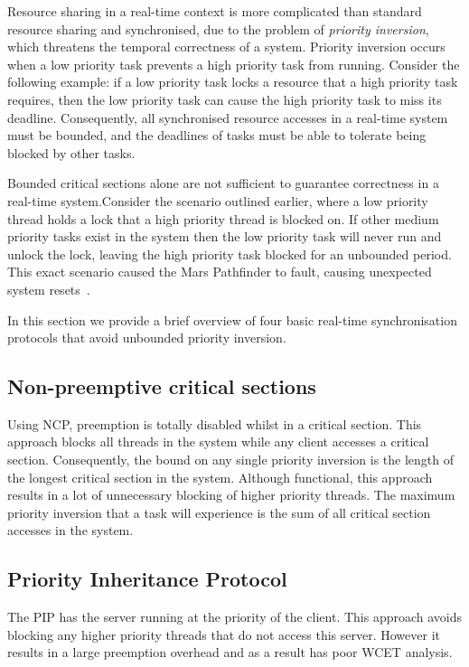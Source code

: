 Resource sharing in a real-time context is more complicated than standard resource sharing and synchronised, due to the problem of \emph{priority inversion}, which threatens the temporal correctness of a system.
Priority inversion occurs when a low priority task prevents a high priority task from running.
Consider the following example: if a low priority task locks a resource that a high priority task requires, then the low priority task can cause the high priority task to miss its deadline.
Consequently, all synchronised resource accesses in a real-time system must be bounded, and the deadlines of tasks must be able to tolerate being blocked by other tasks.

Bounded critical sections alone are not sufficient to guarantee correctness in a real-time system.Consider the scenario outlined earlier, where a low priority thread holds a lock that a high priority thread is blocked on.
If other medium priority tasks exist in the system then the low priority task will never run and unlock the lock, leaving the high priority task blocked for an unbounded period.
This exact scenario caused the Mars Pathfinder to fault, causing unexpected system resets~\citep{Mars_Pathfinder}.

In this section we provide a brief overview of four basic real-time synchronisation protocols that avoid unbounded priority inversion.

\subsection{Non-preemptive critical sections}

Using \gls{NCP}, preemption is totally disabled whilst in a critical section.
This approach blocks all threads in the system while any client accesses a critical section.
Consequently, the bound on any single priority inversion is the length of the longest critical section in the system.
Although functional, this approach results in a lot of unnecessary blocking of higher priority threads.
The maximum priority inversion that a task will experience is the sum of all critical section accesses in the system.

\subsection{Priority Inheritance Protocol}
\label{sec:pip}

The \gls{PIP} has the server running at the priority of the client.
This approach avoids blocking any higher priority threads that do not access this server.
However it results in a large preemption overhead and as a result has poor WCET analysis.

